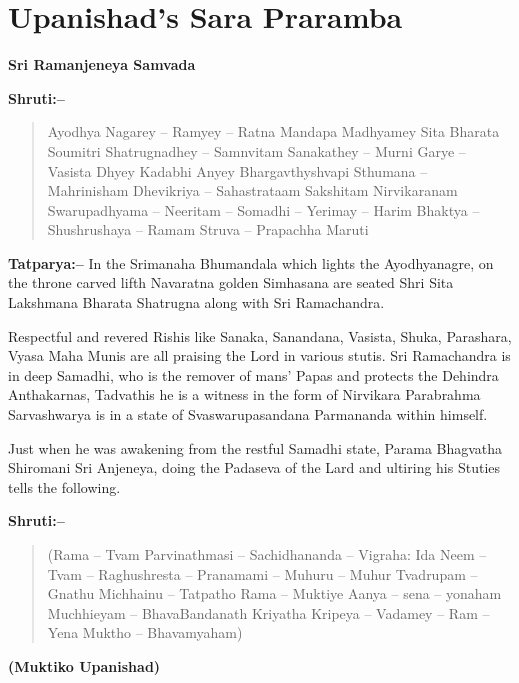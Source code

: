 
\chapter{Upanishad's Sara Praramba}

\begin{center}
\textbf{Sri Ramanjeneya Samvada}
\end{center}

\textbf{Shruti:–}

\begin{verse}
Ayodhya Nagarey – Ramyey – Ratna Mandapa  Madhyamey  Sita Bharata Soumitri Shatrugnadhey – Samnvitam  Sanakathey – Murni Garye – Vasista Dhyey Kadabhi  Anyey Bhargavthyshvapi Sthumana – Mahrinisham  Dhevikriya – Sahastrataam Sakshitam Nirvikaranam  Swarupadhyama – Neeritam – Somadhi – Yerimay – Harim Bhaktya – Shushrushaya – Ramam Struva – Prapachha Maruti 
\end{verse}

\textbf{Tatparya:–} In the Srimanaha Bhumandala which lights the Ayodhyanagre, on the throne carved lifth Navaratna golden Simhasana are seated Shri Sita Lakshmana Bharata Shatrugna along with Sri Ramachandra.

Respectful and revered Rishis like Sanaka, Sanandana, Vasista, Shuka, Parashara, Vyasa Maha Munis are all praising the Lord in various stutis. Sri Ramachandra is in deep Samadhi, who is the remover of mans' Papas and protects the Dehindra Anthakarnas, Tadvathis he is a witness in the form of Nirvikara Parabrahma Sarvashwarya is in a state of Svaswarupasandana Parmananda within himself.

Just when he was awakening from the restful Samadhi state, Parama Bhagvatha Shiromani Sri Anjeneya, doing the Padaseva of the Lard and ultiring his Stuties tells the following.

\textbf{Shruti:–}

\begin{verse}
(Rama – Tvam Parvinathmasi – Sachidhananda – Vigraha:  Ida Neem – Tvam – Raghushresta – Pranamami – Muhuru – Muhur  Tvadrupam –Gnathu Michhainu – Tatpatho Rama – Muktiye  Aanya – sena – yonaham Muchhieyam – BhavaBandanath  Kriyatha Kripeya – Vadamey – Ram – Yena Muktho – Bhavamyaham)
\end{verse}

\begin{flushright}
\textbf{(Muktiko Upanishad)}
\end{flushright}

